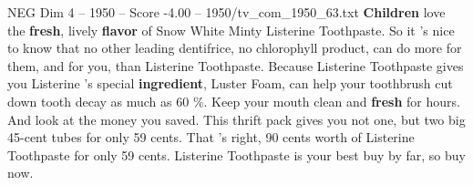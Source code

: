 \begin{textsample}{NEG Dim 4 – 1950 – Score -4.00 – 1950/tv\_com\_1950\_63.txt}  \label{ex:f4_neg_007}
\textbf{Children} love the \textbf{fresh}, lively \textbf{flavor} of Snow White Minty Listerine Toothpaste.
So it 's nice to know that no other leading dentifrice, no chlorophyll product, can do more for them, and for you, than Listerine Toothpaste.
Because Listerine Toothpaste gives you Listerine 's special \textbf{ingredient}, Luster Foam, can help your toothbrush cut down tooth decay as much as 60 \%.
Keep your mouth clean and \textbf{fresh} for hours.
And look at the money you saved.
This thrift pack gives you not one, but two big 45-cent tubes for only 59 cents.
That 's right, 90 cents worth of Listerine Toothpaste for only 59 cents.
Listerine Toothpaste is your best buy by far, so buy now.

\end{textsample}
